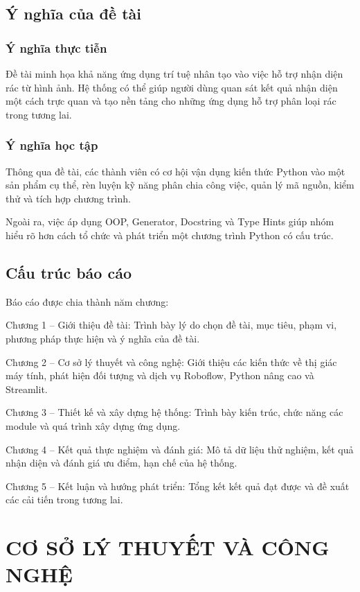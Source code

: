 \documentclass[a4paper,13pt]{extarticle}
\begin{document}
\subsection{Ý nghĩa của đề tài}

\subsubsection{Ý nghĩa thực tiễn}
Đề tài minh họa khả năng ứng dụng trí tuệ nhân tạo vào việc hỗ trợ nhận diện rác từ hình ảnh. Hệ thống có thể giúp người dùng quan sát kết quả nhận diện một cách trực quan và tạo nền tảng cho những ứng dụng hỗ trợ phân loại rác trong tương lai.

\subsubsection{Ý nghĩa học tập}
Thông qua đề tài, các thành viên có cơ hội vận dụng kiến thức Python vào một sản phẩm cụ thể, rèn luyện kỹ năng phân chia công việc, quản lý mã nguồn, kiểm thử và tích hợp chương trình.

Ngoài ra, việc áp dụng OOP, Generator, Docstring và Type Hints giúp nhóm hiểu rõ hơn cách tổ chức và phát triển một chương trình Python có cấu trúc.

\subsection{Cấu trúc báo cáo}
Báo cáo được chia thành năm chương:

    {Chương 1 -- Giới thiệu đề tài:} Trình bày lý do chọn đề tài, mục tiêu, phạm vi, phương pháp thực hiện và ý nghĩa của đề tài.
    
    {Chương 2 -- Cơ sở lý thuyết và công nghệ:} Giới thiệu các kiến thức về thị giác máy tính, phát hiện đối tượng và dịch vụ Roboflow, Python nâng cao và Streamlit.
   
    {Chương 3 -- Thiết kế và xây dựng hệ thống:} Trình bày kiến trúc, chức năng các module và quá trình xây dựng ứng dụng.
    
    {Chương 4 -- Kết quả thực nghiệm và đánh giá:} Mô tả dữ liệu thử nghiệm, kết quả nhận diện và đánh giá ưu điểm, hạn chế của hệ thống.
   
    {Chương 5 -- Kết luận và hướng phát triển:} Tổng kết kết quả đạt được và đề xuất các cải tiến trong tương lai.

\section{CƠ SỞ LÝ THUYẾT VÀ CÔNG NGHỆ}
\end{document}

